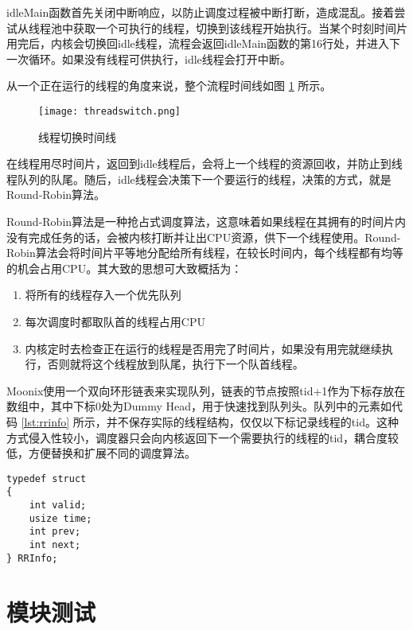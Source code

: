 idleMain函数首先关闭中断响应，以防止调度过程被中断打断，造成混乱。接着尝试从线程池中获取一个可执行的线程，切换到该线程开始执行。当某个时刻时间片用完后，内核会切换回idle线程，流程会返回idleMain函数的第16行处，并进入下一次循环。如果没有线程可供执行，idle线程会打开中断。

从一个正在运行的线程的角度来说，整个流程时间线如图 \ref{pic:threadswitch} 所示。

\begin{figure}[htpb]
	\centering
	\texttt{[image: threadswitch.png]}
	\setlength{\abovecaptionskip}{2pt}
	\caption{线程切换时间线}
	\label{pic:threadswitch}
\end{figure}

在线程用尽时间片，返回到idle线程后，会将上一个线程的资源回收，并防止到线程队列的队尾。随后，idle线程会决策下一个要运行的线程，决策的方式，就是Round-Robin算法。

Round-Robin算法是一种抢占式调度算法，这意味着如果线程在其拥有的时间片内没有完成任务的话，会被内核打断并让出CPU资源，供下一个线程使用。Round-Robin算法会将时间片平等地分配给所有线程，在较长时间内，每个线程都有均等的机会占用CPU。其大致的思想可大致概括为：

\begin{enumerate}
	\item 将所有的线程存入一个优先队列
	\item 每次调度时都取队首的线程占用CPU
	\item 内核定时去检查正在运行的线程是否用完了时间片，如果没有用完就继续执行，否则就将这个线程放到队尾，执行下一个队首线程。
\end{enumerate}

Moonix使用一个双向环形链表来实现队列，链表的节点按照tid+1作为下标存放在数组中，其中下标0处为Dummy Head，用于快速找到队列头。队列中的元素如代码 \ref{lst:rrinfo} 所示，并不保存实际的线程结构，仅仅以下标记录线程的tid。这种方式侵入性较小，调度器只会向内核返回下一个需要执行的线程的tid，耦合度较低，方便替换和扩展不同的调度算法。

\begin{minipage}[c]{0.95\textwidth}
\begin{lstlisting}[language={moonix}, caption={线程调度器元素}, label={lst:rrinfo}]
typedef struct
{
	int valid;
	usize time;
	int prev;
	int next;
} RRInfo;
\end{lstlisting}
\end{minipage}

\section{模块测试}

